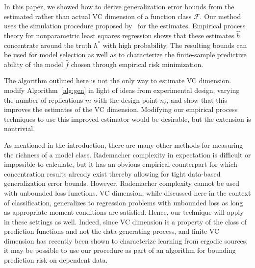 \documentclass[11pt]{article}
\newcommand{\F}{\mathcal{F}}
\renewcommand{\hat}[1]{\widehat{#1}}
\begin{document}
In this paper, we showed how to derive generalization error bounds from the
estimated rather than actual VC dimension of a function class $\F$. Our method
uses the simulation procedure proposed by~\citet{VapnikLevin1994} for the
estimates.  Empirical process theory for nonparametric least squares regression
shows that these estimates $\hat{h}$ concentrate around the truth $h^*$ with
high probability. The resulting bounds can be used for model selection as well
as to characterize the finite-sample predictive ability of the model $\hat{f}$
chosen through empirical risk minimization.

The algorithm outlined here is not the only way to estimate VC dimension.
\citet{ShaoCherkassky2000} modify Algorithm~\ref{alg:gen} in light of ideas
from experimental design, varying the number of replications $m$ with the
design point $n_\ell$, and show that this improves the estimates of the VC
dimension. Modifying our empirical process techniques to use this improved
estimator would be desirable, but the extension is nontrivial.

As mentioned in the introduction, there are many other methods for measuring
the richness of a model class. Rademacher complexity in expectation is
difficult or impossible to calculate, but it has an obvious empirical
counterpart for which concentration results already exist thereby allowing for
tight data-based generalization error bounds. However, Rademacher complexity
cannot be used with unbounded loss functions. VC dimension, while discussed
here in the context of classification, generalizes to regression problems with
unbounded loss as long as appropriate moment conditions are satisfied. Hence,
our technique will apply in these settings as well.  Indeed, since VC dimension
is a property of the class of prediction functions and not the data-generating
process, and finite VC dimension has recently
\citep{Adams-Nobel-VC-classes-under-ergodic} been shown to characterize
learning from ergodic sources, it may be possible to use our procedure as part
of an algorithm for bounding prediction risk on dependent data.




\end{document}
